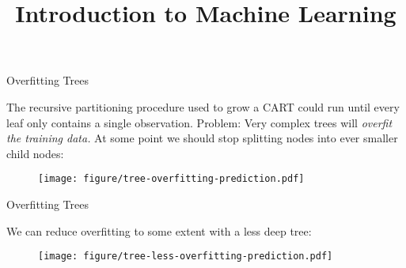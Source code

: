 \documentclass[11pt,compress,t,notes=noshow, xcolor=table]{beamer}
\title{Introduction to Machine Learning}
\institute{\href{https://compstat-lmu.github.io/lecture_i2ml/}{compstat-lmu.github.io/lecture\_i2ml}}
\date{}
\begin{document}
\sloppy





\begin{vbframe}{Overfitting Trees}

The recursive partitioning procedure used to grow a CART could run until every leaf only contains a single observation. Problem: Very complex trees will \emph{overfit the training data.} At some point we should stop splitting nodes into ever smaller child nodes: 

\begin{figure}
\centering
\texttt{[image: figure/tree-overfitting-prediction.pdf]}
\end{figure}


\end{vbframe}

\begin{vbframe}{Overfitting Trees}

We can reduce overfitting to some extent with a less deep tree:
\vspace{0.25cm}

\begin{figure}
\centering
\texttt{[image: figure/tree-less-overfitting-prediction.pdf]}
\end{figure}

\end{vbframe}
\end{document}
